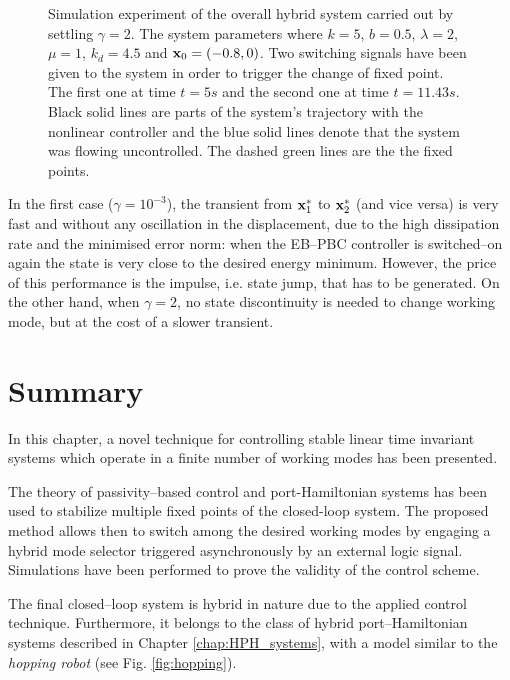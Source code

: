 \begin{figure}[!ht]
	\centering
	\caption[Simulation experiment of the overall hybrid system with $\gamma = 2$]{Simulation experiment of the overall hybrid system carried out by settling $\gamma = 2$. The system parameters where $k = 5$, $b = 0.5$, $\lambda = 2$, $\mu = 1$, $k_d = 4.5$ and $\mathbf{x}_0 = (-0.8,0)$. 
	Two switching signals have been given to the system in order to trigger the change of fixed point. The first one at time $t = 5s$ and the second one at time $t = 11.43s$. Black solid lines are parts of the system's trajectory with the nonlinear controller and the blue solid lines denote that the system was flowing uncontrolled. The dashed green lines are the the fixed points.
	}
	\label{fig:exp2}
\end{figure}
%
In the first case ($\gamma = 10^{-3}$), the transient from $\mathbf{x}_1^*$ to $\mathbf{x}_2^*$ (and vice versa) is very fast and without any oscillation in the displacement, due to the high dissipation rate and the minimised error norm: when the EB--PBC controller is switched--on again the state is very close to the desired energy minimum. However, the price of this performance is the impulse, i.e. state jump, that has to be generated. On the other hand, when $\gamma = 2$, no state discontinuity is needed to change working mode, but at the cost of a slower transient.
%
\clearpage
%
\section{Summary}
In this chapter, a novel technique for controlling stable linear time invariant systems which operate in a finite number of working modes has been presented. 
%
\newline

%
The theory of passivity--based control and port-Hamiltonian systems has been used to stabilize multiple fixed points of the closed-loop system. The proposed method allows then to switch among the desired working modes by engaging a hybrid mode selector triggered asynchronously by an external logic signal. Simulations have been performed to prove the validity of the control scheme. 
%
\newline

%
The final closed--loop system is hybrid in nature due to the applied control technique. Furthermore, it belongs to the class of hybrid port--Hamiltonian systems described in Chapter \ref{chap:HPH_systems}, with a model similar to the \textit{hopping robot} (see Fig. \ref{fig:hopping}).

